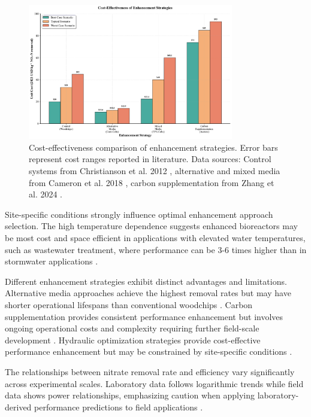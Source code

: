 \documentclass[12pt,a4paper]{article}
\begin{document}
\begin{figure}[H]
\centering
\includegraphics[width=0.8\textwidth]{fig5_cost_analysis}
\caption{Cost-effectiveness comparison of enhancement strategies. Error bars represent cost ranges reported in literature. Data sources: Control systems from Christianson et al. 2012 \citep{RN289}, alternative and mixed media from Cameron et al. 2018 \citep{RN350}, carbon supplementation from Zhang et al. 2024 \citep{RN196}.}
\label{fig:cost_analysis}
\end{figure}

Site-specific conditions strongly influence optimal enhancement approach selection. The high temperature dependence suggests enhanced bioreactors may be most cost and space efficient in applications with elevated water temperatures, such as wastewater treatment, where performance can be 3-6 times higher than in stormwater applications \citep{RN258, RN315}.

Different enhancement strategies exhibit distinct advantages and limitations. Alternative media approaches achieve the highest removal rates but may have shorter operational lifespans than conventional woodchips \citep{RN350, RN624}. Carbon supplementation provides consistent performance enhancement but involves ongoing operational costs and complexity requiring further field-scale development \citep{RN632, RN196}. Hydraulic optimization strategies provide cost-effective performance enhancement but may be constrained by site-specific conditions \citep{RN309}.

The relationships between nitrate removal rate and efficiency vary significantly across experimental scales. Laboratory data follows logarithmic trends while field data shows power relationships, emphasizing caution when applying laboratory-derived performance predictions to field applications \citep{RN312}.
\end{document}
